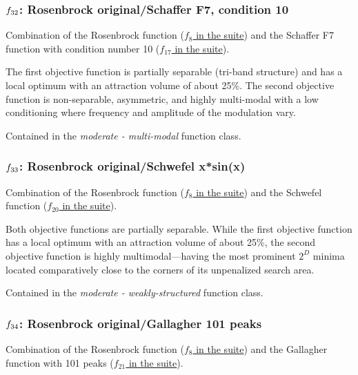 \documentclass[letterpaper,12pt,english]{article}
\begin{document}
\subsubsection{\protect\(f_{32}\protect\): Rosenbrock original/Schaffer F7, condition 10}
\label{index:f32}\label{index:rosenbrock-original-schaffer-f7-condition-10}
Combination of the Rosenbrock function (\href{http://coco.lri.fr/downloads/download15.03/bbobdocfunctions.pdf\#page=40}{\(f_8\) in the  suite}) and the
Schaffer F7 function with condition number 10
(\href{http://coco.lri.fr/downloads/download15.03/bbobdocfunctions.pdf\#page=85}{\(f_{17}\) in the  suite}).

The first objective function is partially separable (tri-band structure)
and has a local optimum with an attraction volume of about 25\%.
The second objective function is non-separable, asymmetric, and
highly multi-modal with a low conditioning where
frequency and amplitude of the modulation vary.

Contained in the \emph{moderate - multi-modal} function class.


\subsubsection{\protect\(f_{33}\protect\): Rosenbrock original/Schwefel x*sin(x)}
\label{index:rosenbrock-original-schwefel-x-sin-x}\label{index:f33}
Combination of the Rosenbrock function (\href{http://coco.lri.fr/downloads/download15.03/bbobdocfunctions.pdf\#page=40}{\(f_8\) in the  suite}) and the
Schwefel function (\href{http://coco.lri.fr/downloads/download15.03/bbobdocfunctions.pdf\#page=100}{\(f_{20}\) in the  suite}).

Both objective functions are partially separable.
While the first objective function has a local optimum with an attraction
volume of about 25\%, the second objective function is highly
multimodal---having the most prominent \(2^D\) minima located
comparatively close to the corners of its unpenalized search area.

Contained in the \emph{moderate - weakly-structured} function class.


\subsubsection{\protect\(f_{34}\protect\): Rosenbrock original/Gallagher 101 peaks}
\label{index:f34}\label{index:rosenbrock-original-gallagher-101-peaks}
Combination of the Rosenbrock function (\href{http://coco.lri.fr/downloads/download15.03/bbobdocfunctions.pdf\#page=40}{\(f_8\) in the  suite}) and
the Gallagher function with 101 peaks (\href{http://coco.lri.fr/downloads/download15.03/bbobdocfunctions.pdf\#page=105}{\(f_{21}\) in the  suite}).
\end{document}
